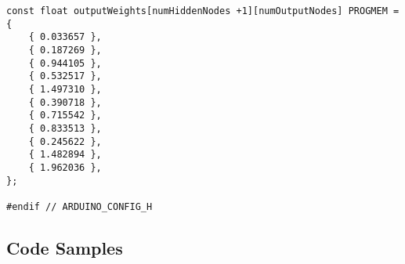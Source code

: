 \documentclass[a4paper]{article}
\begin{document}
\begin{lstlisting}
const float outputWeights[numHiddenNodes +1][numOutputNodes] PROGMEM = {
    { 0.033657 }, 
    { 0.187269 }, 
    { 0.944105 }, 
    { 0.532517 }, 
    { 1.497310 }, 
    { 0.390718 }, 
    { 0.715542 }, 
    { 0.833513 }, 
    { 0.245622 }, 
    { 1.482894 }, 
    { 1.962036 }, 
};

#endif // ARDUINO_CONFIG_H
\end{lstlisting}


\subsection{Code Samples}%



\newpage
\newpage
{}
\end{document}
